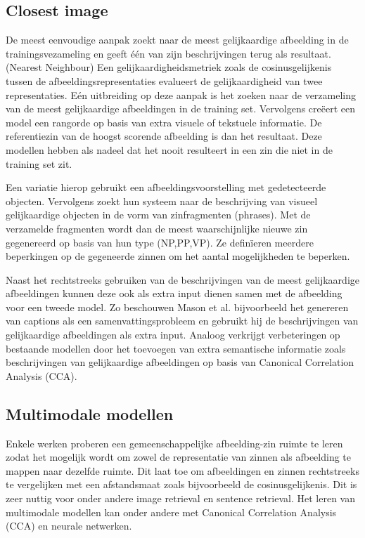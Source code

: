 \subsection{Closest image}
De meest eenvoudige aanpak zoekt naar de meest gelijkaardige afbeelding in de trainingsvezameling en geeft \'e\'en van zijn beschrijvingen terug als resultaat. (Nearest Neighbour)\cite{Devlin2015a} Een gelijkaardigheidsmetriek zoals de cosinusgelijkenis tussen de afbeeldingsrepresentaties evalueert de gelijkaardigheid van twee representaties.
E\'en uitbreiding op deze aanpak is het zoeken naar de verzameling van de meest gelijkaardige afbeeldingen in de training set. Vervolgens cre\"eert een model een rangorde op basis van extra visuele of tekstuele informatie. De referentiezin van de hoogst scorende afbeelding is dan het resultaat. \cite{Ordonez2011,Oliva2006,Hodosh2013,Devlin2015a}
Deze modellen hebben als nadeel dat het nooit resulteert in een zin die niet in de training set zit.

Een variatie hierop \cite{Kuznetsova2012,Gupta2012} gebruikt een afbeeldingsvoorstelling met gedetecteerde objecten. Vervolgens zoekt hun systeem naar de beschrijving van visueel gelijkaardige objecten in de vorm van zinfragmenten (phrases). Met de verzamelde fragmenten wordt dan de meest waarschijnlijke nieuwe zin gegenereerd op basis van hun type (NP,PP,VP). Ze defin\"ieren meerdere beperkingen op de gegeneerde zinnen om het aantal mogelijkheden te beperken.

Naast het rechtstreeks gebruiken van de beschrijvingen van de meest gelijkaardige afbeeldingen kunnen deze ook als extra input dienen samen met de afbeelding voor een tweede model. Zo beschouwen Mason et al.\cite{Mason2014} bijvoorbeeld het genereren van captions als een samenvattingsprobleem en gebruikt hij de beschrijvingen van gelijkaardige afbeeldingen als extra input. Analoog verkrijgt \cite{Fernando2015} verbeteringen op bestaande modellen door het toevoegen van extra semantische informatie zoals beschrijvingen van gelijkaardige afbeeldingen op basis van Canonical Correlation Analysis (CCA).
 
\subsection{Multimodale modellen}
Enkele werken proberen een gemeenschappelijke afbeelding-zin ruimte te leren zodat het mogelijk wordt om zowel de representatie van zinnen als afbeelding te mappen naar dezelfde ruimte. Dit laat toe om afbeeldingen en zinnen rechtstreeks te vergelijken met een afstandsmaat zoals bijvoorbeeld de cosinusgelijkenis. Dit is zeer nuttig voor onder andere image retrieval en sentence retrieval. Het leren van multimodale modellen kan onder andere met Canonical Correlation Analysis (CCA)\cite{Hodosh2013} en neurale netwerken. \cite{Mao2014,Karpathy2014,Kiros2013}

